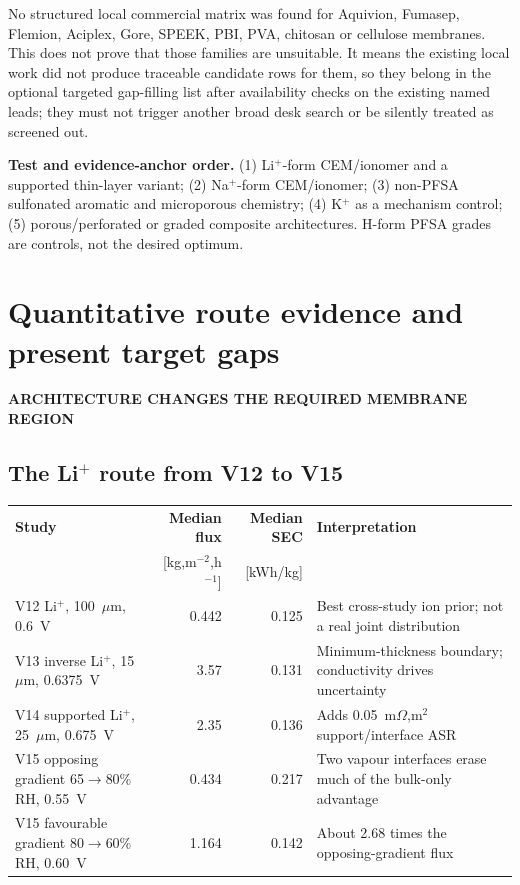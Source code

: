 \documentclass[10pt,a4paper]{article}
\newcommand{\eyebrow}[1]{{\sffamily\bfseries\small\color{Teal}\MakeUppercase{#1}}}
\begin{document}
No structured local commercial matrix was found for Aquivion, Fumasep,
Flemion, Aciplex, Gore, SPEEK, PBI, PVA, chitosan or cellulose membranes. This
does not prove that those families are unsuitable. It means the existing local
work did not produce traceable candidate rows for them, so they belong in the
optional targeted gap-filling list after availability checks on the existing
named leads; they must not trigger another broad desk search or be silently
treated as screened out.

\begin{plainbox}
\textbf{Test and evidence-anchor order.} (1) Li$^+$-form CEM/ionomer and a
supported thin-layer variant; (2) Na$^+$-form CEM/ionomer; (3) non-PFSA
sulfonated aromatic and microporous chemistry; (4) K$^+$ as a mechanism
control; (5) porous/perforated or graded composite architectures. H-form PFSA
grades are controls, not the desired optimum.
\end{plainbox}

\section{Quantitative route evidence and present target gaps}
\eyebrow{Architecture changes the required membrane region}

\subsection{The Li$^+$ route from V12 to V15}

\begin{center}\small
\begin{tabularx}{\textwidth}{@{}p{23mm}r r Y@{}}
\toprule
\textbf{Study} & \textbf{Median flux} & \textbf{Median SEC} & \textbf{Interpretation} \\
 & [kg,m$^{-2}$,h$^{-1}$] & [kWh/kg] & \\
\midrule
V12 Li$^+$, 100~$\mu$m, 0.6~V & 0.442 & 0.125 & Best cross-study ion prior; not a real joint distribution \\
V13 inverse Li$^+$, 15~$\mu$m, 0.6375~V & 3.57 & 0.131 & Minimum-thickness boundary; conductivity drives uncertainty \\
V14 supported Li$^+$, 25~$\mu$m, 0.675~V & 2.35 & 0.136 & Adds 0.05~m$\Omega$,m$^2$ support/interface ASR \\
V15 opposing gradient 65$\rightarrow$80\% RH, 0.55~V & 0.434 & 0.217 & Two vapour interfaces erase much of the bulk-only advantage \\
V15 favourable gradient 80$\rightarrow$60\% RH, 0.60~V & 1.164 & 0.142 & About 2.68 times the opposing-gradient flux \\
\bottomrule
\end{tabularx}
\end{center}
\end{document}

